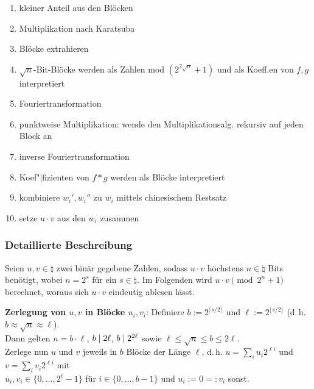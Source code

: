 \begin{enumerate}
    \item
    kleiner Anteil aus den Blöcken
    
    \item
    Multiplikation nach Karatsuba
    
    \item
    Blöcke extrahieren
    
    \item
    $\sqrt{n}$-Bit-Blöcke werden als Zahlen mod $(2^{2\sqrt{n}} + 1)$ und als Koeff.en
    von $f, g$ interpretiert
    
    \item
    Fouriertransformation
    
    \item
    punktweise Multiplikation: wende den Multiplikationsalg. rekursiv auf jeden Block an
    
    \item
    inverse Fouriertransformation
    
    \item
    Koef"|fizienten von $f \ast g$ werden als Blöcke interpretiert
    
    \item
    kombiniere $w_i', w_i''$ zu $w_i$ mittels chinesischem Restsatz
    
    \item
    setze $u \cdot v$ aus den $w_i$ zusammen
\end{enumerate}

\pagebreak

\subsubsection{%
    Detaillierte Beschreibung%
}

Seien $u, v \in \natural$ zwei binär gegebene Zahlen,
sodass $u \cdot v$ höchstens $n \in \natural$ Bits benötigt, wobei $n = 2^s$ für ein
$s \in \natural$.
Im Folgenden wird $u \cdot v \pmod{2^n + 1}$ berechnet, woraus sich $u \cdot v$ eindeutig ablesen
lässt.

\textbf{Zerlegung von $u, v$ in Blöcke $u_i, v_i$}:
Definiere $b := 2^{\lceil s/2 \rceil}$ und $\ell := 2^{\lfloor s/2 \rfloor}$
(d.\,h. $b \approx \sqrt{n} \approx \ell$).\\
Dann gelten $n = b \cdot \ell$, $b \mid 2\ell$, $b \mid 2^{2\ell}$ sowie
$\ell \le \sqrt{n} \le b \le 2\ell$.\\
Zerlege nun $u$ und $v$ jeweils in $b$ Blöcke der Länge $\ell$,
d.\,h. $u = \sum_i u_i 2^{\ell i}$ und $v = \sum_i v_i 2^{\ell i}$ mit\\
$u_i, v_i \in \{0, \dotsc, 2^\ell - 1\}$ für $i \in \{0, \dotsc, b - 1\}$ und
$u_i := 0 =: v_i$ sonst.

